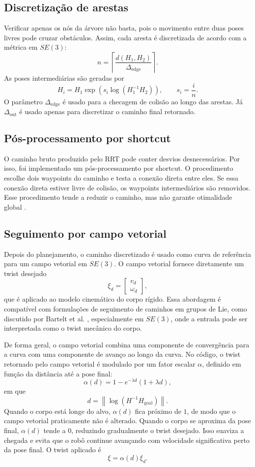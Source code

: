\documentclass[12pt,a4paper]{article}
\begin{document}
\subsection{Discretização de arestas}

Verificar apenas os nós da árvore não basta, pois o movimento entre duas poses
livres pode cruzar obstáculos. Assim, cada aresta é discretizada de acordo com a
métrica em \(SE(3)\):
\[
n =
\left\lceil
\frac{d(H_1,H_2)}{\Delta_{\mathrm{edge}}}
\right\rceil.
\]
As poses intermediárias são geradas por
\[
H_i =
H_1
\exp\left(
s_i\log(H_1^{-1}H_2)
\right),
\qquad
s_i = \frac{i}{n}.
\]
O parâmetro \(\Delta_{\mathrm{edge}}\) é usado para a checagem de colisão ao
longo das arestas. Já \(\Delta_{\mathrm{out}}\) é usado apenas para discretizar
o caminho final retornado.

\subsection{Pós-processamento por shortcut}

O caminho bruto produzido pelo RRT pode conter desvios desnecessários. Por isso,
foi implementado um pós-processamento por shortcut. O procedimento escolhe dois
waypoints do caminho e testa a conexão direta entre eles. Se essa conexão direta
estiver livre de colisão, os waypoints intermediários são removidos. Esse
procedimento tende a reduzir o caminho, mas não garante otimalidade global
\cite{LaValle2006,Choset2005}.

\subsection{Seguimento por campo vetorial}

Depois do planejamento, o caminho discretizado é usado como curva de referência
para um campo vetorial em \(SE(3)\). O campo vetorial fornece diretamente um
twist desejado
\[
\xi_d =
\begin{bmatrix}
v_d \\
\omega_d
\end{bmatrix},
\]
que é aplicado ao modelo cinemático do corpo rígido. Essa abordagem é compatível
com formulações de seguimento de caminhos em grupos de Lie, como discutido por
Bartelt et al. \cite{Bartelt2026}, especialmente em \(SE(3)\), onde a entrada
pode ser interpretada como o twist mecânico do corpo.

De forma geral, o campo vetorial combina uma componente de convergência para a
curva com uma componente de avanço ao longo da curva. No código, o twist
retornado pelo campo vetorial é modulado por um fator escalar \(\alpha\),
definido em função da distância até a pose final:
\[
\alpha(d)
=
1
-
e^{-\lambda d}
\left(
1+\lambda d
\right),
\]
em que
\[
d =
\left\|
\log\left(
H^{-1}H_{\mathrm{goal}}
\right)
\right\|.
\]
Quando o corpo está longe do alvo, \(\alpha(d)\) fica próximo de \(1\), de modo
que o campo vetorial praticamente não é alterado. Quando o corpo se aproxima da
pose final, \(\alpha(d)\) tende a \(0\), reduzindo gradualmente o twist desejado.
Isso suaviza a chegada e evita que o robô continue avançando com velocidade
significativa perto da pose final. O twist aplicado é
\[
\xi =
\alpha(d)\xi_d.
\]
\end{document}

